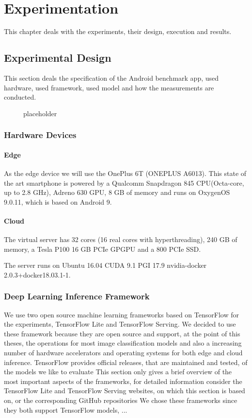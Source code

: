 \chapter{Experimentation}
\label{chap:experiments}
This chapter deals with the experiments, their design, execution and results.

 
\section{Experimental Design}
This section deals the specification of the Android benchmark app, used hardware, used framework, used model and how the measurements are conducted. 
\begin{figure}[H]
\centering

\caption{placeholder}
\label{fig:expDesign}
\end{figure}


\subsection{Hardware Devices}
\subsubsection{Edge}
\label{chap:hardwareEdge}
As the edge device we will use the OnePlus 6T (ONEPLUS A6013). This state of the art smartphone is powered by a Qualcomm Snapdragon 845 CPU(Octa-core, up to 2.8 GHz), Adreno 630 GPU, 8 GB of memory and runs on OxygenOS 9.0.11, which is based on Android 9.
\subsubsection{Cloud}
The virtual server has 32 cores (16 real cores with hyperthreading), 240 GB of memory, a Tesla P100 16 GB PCIe GPGPU and a 800 PCIe SSD.

The server runs on Ubuntu 16.04 CUDA 9.1 PGI 17.9 nvidia-docker 2.0.3+docker18.03.1-1.
\subsection{Deep Learning Inference Framework}
We use two open source machine learning frameworks based on TensorFlow for the experiments, TensorFlow Lite and TensorFlow Serving. We decided to use these framework because they are open source and support, at the point of this theses, the operations for most image classification models and also a increasing number of hardware accelerators and operating systems for both edge and cloud inference.
TensorFlow provides official releases, that are maintained and tested, of the models we like to evaluate
This section only gives a brief overview of the most important aspects of the frameworks, for detailed information consider the TensorFlow Lite\cite{tfLite}  and TensorFlow Serving\cite{tfServing} websites, on which this section is based on, or the corresponding GitHub repositories
We chose these frameworks since they both support TensorFlow models, ...%
